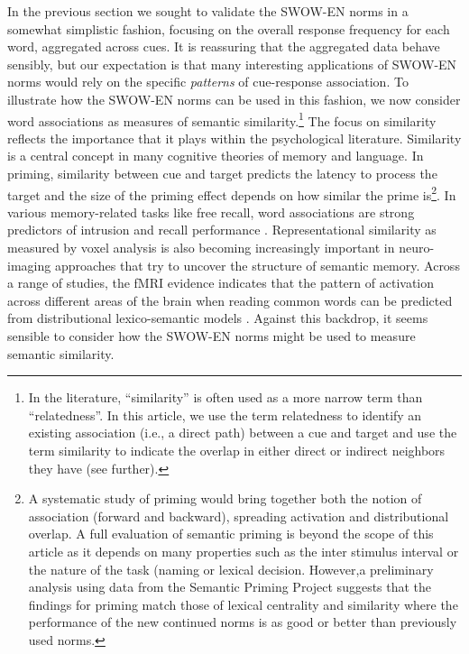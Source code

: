 \documentclass[a4paper,doc,natbib,floatsintext]{apa6}
\begin{document}
In the previous section we sought to validate the SWOW-EN norms in a somewhat simplistic fashion, focusing on the overall response frequency for each word, aggregated across cues. It is reassuring that the aggregated data behave sensibly, but our expectation is that many interesting applications of SWOW-EN norms would rely on the specific \textit{patterns} of cue-response association. To illustrate how the SWOW-EN norms can be used in this fashion, we now consider word associations as measures of semantic similarity.\footnote{In the literature, ``similarity'' is often used as a more narrow term than ``relatedness''. In this article, we use the term relatedness to identify an existing association (i.e., a direct path) between a cue and target and use the term similarity to indicate the overlap in either direct or indirect neighbors they have (see further).} The focus on similarity reflects the importance that it plays within the psychological literature. Similarity is a central concept in many cognitive theories of memory and language. In priming, similarity between cue and target predicts the latency to process the target and the size of the priming effect depends on how similar the prime is\footnote{A systematic study of priming would bring together both the notion of association (forward and backward), spreading activation and distributional overlap. A full evaluation of semantic priming is beyond the scope of this article as it depends on many properties such as the inter stimulus interval or the nature of the task (naming or lexical decision. However,a preliminary analysis using data from the Semantic Priming Project \citep{HutchisonBalota2013} suggests that the findings for priming match those of lexical centrality and similarity where the performance of the new continued norms is as good or better than previously used norms.}. In various memory-related tasks like free recall, word associations are strong predictors of intrusion and recall performance \citep{Deese1959}. Representational similarity as measured by voxel analysis is also becoming increasingly important in neuro-imaging approaches that try to uncover the structure of semantic memory. Across a range of studies, the fMRI evidence indicates that the pattern of activation across different areas of the brain when reading common words \citep{Mitchell2008} can be predicted from distributional lexico-semantic models \citep{Schloss2016}. Against this backdrop, it seems sensible to consider how the SWOW-EN norms might be used to measure semantic similarity.
\end{document}
